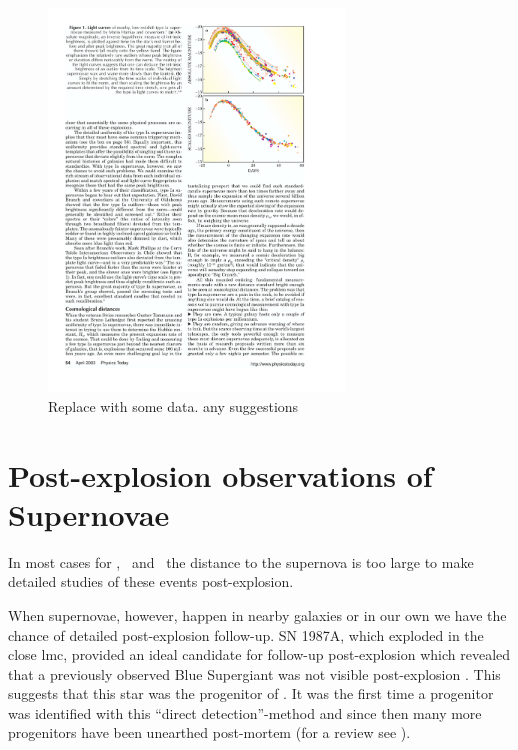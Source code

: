 \begin{figure}[htbp] %
   \centering
   \includegraphics[width=0.7\textwidth]{chapter_intro/plots/lightcurve_scaled_perlmutter2003.pdf} 
   \caption{Replace with some data. any suggestions}
   \label{fig:normalized_lightcurve}
\end{figure}

\section{Post-explosion observations of Supernovae}

In most cases for \sneia, \sneibc\ and \sneii\ the distance to the supernova is too large to make detailed studies of these events post-explosion. 

When supernovae, however, happen in nearby galaxies or in our own we have the chance of detailed post-explosion follow-up.
SN 1987A, which exploded in the close \gls{lmc}, provided an ideal candidate for follow-up post-explosion which revealed that a previously observed Blue Supergiant was not visible post-explosion \cite{1989A&A...219..229W}. This suggests that this star was the progenitor of . It was the first time a progenitor was identified with this ``direct detection''-method and since then many more progenitors have been unearthed post-mortem (for a review see 
\cite{2009ARA&A..47...63S}).


